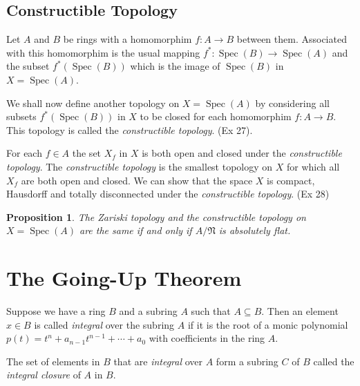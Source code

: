 \documentclass[]{report}
\newtheorem{prop}[theorem]{Proposition}
\DeclareMathOperator\Spec{Spec}
\newcommand\mfk[1]{\mathfrak{#1}}
\begin{document}

\section{Constructible Topology}

Let $A$ and $B$ be rings with a homomorphim $f: A \rightarrow B$ between them. Associated with this homomorphim is the usual mapping $f^*: \Spec(B) \rightarrow \Spec(A)$ and the subset $f^*(\Spec(B))$ which is the image of $\Spec(B)$ in $X = \Spec(A)$.

We shall now define another topology on $X = \Spec(A)$ by considering all subsets $f^*(\Spec(B))$ in $X$ to be closed for each homomorphim $f: A \rightarrow B$. This topology is called the \textit{constructible topology}. (Ex 27).

For each $f \in A$ the set $X_f$ in $X$ is both open and closed under the \textit{constructible topology}. The \textit{constructible topology} is the smallest topology on $X$ for which all $X_f$ are both open and closed. We can show that the space $X$ is compact, Hausdorff and totally disconnected under the \textit{constructible topology}. (Ex 28)

\begin{prop}
    The Zariski topology and the constructible topology on $X = \Spec(A)$ are the same if and only if $A/\mfk{N}$ is \textit{absolutely flat}.
\end{prop}


\chapter{The Going-Up Theorem}

Suppose we have a ring $B$ and a subring $A$ such that $A \subseteq B$. Then an element $x \in B$ is called \textit{integral} over the subring $A$ if it is the root of a monic polynomial $p(t) = t^n + a_{n-1}t^{n-1} + \cdots + a_0$ with coefficients in the ring $A$.

The set of elements in $B$ that are \textit{integral} over $A$ form a subring $C$ of $B$ called the \textit{integral closure} of $A$ in $B$.
\end{document}
